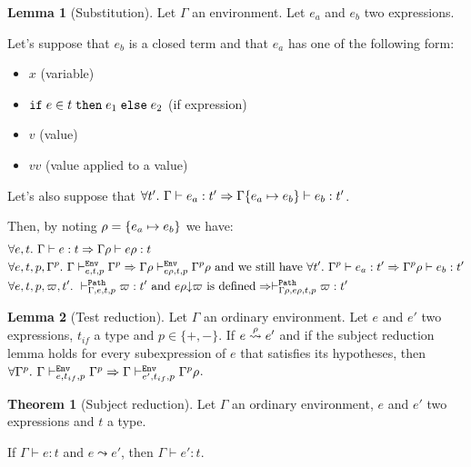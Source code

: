 \documentclass[a4paper]{article}
\theoremstyle{definition}
\newtheorem{theorem}{Theorem}
\newtheorem{lemma}{Lemma}
\begin{document}
        \begin{lemma}[Substitution]
          Let $\Gamma$ an environment. Let $e_a$ and $e_b$ two expressions.

          Let's suppose that $e_b$ is a closed term and that $e_a$ has one of the following form:
          \begin{itemize}
            \item $x$ (variable)
            \item $\ite e t {e_1} {e_2}$ (if expression)
            \item $v$ (value)
            \item $v v$ (value applied to a value)
          \end{itemize}
          Let's also suppose that $\forall t'.\ \Gamma \vdash e_a : t' \Rightarrow \Gamma\subst {e_a} {e_b} \vdash e_b:t'$.
          
          Then, by noting $\rho = \subst {e_a} {e_b}$ we have:
          \begin{align*}
            &\forall e,t.\ \Gamma \vdash e:t \Rightarrow \Gamma\rho \vdash e\rho:t\\
            &\forall e,t,p,\Gamma^p.\ \Gamma \evdash p {e} {t} \Gamma^p \Rightarrow \Gamma\rho \evdash p {e\rho} {t} {\Gamma^p}\rho
            \text{ and we still have } \forall t'.\ \Gamma^p \vdash e_a : t' \Rightarrow \Gamma^p\rho \vdash e_b:t'\\
            &\forall e,t,p,\varpi,t'.\ \pvdash \Gamma p e t \varpi:t' \text{ and }\occ {e\rho} \varpi\text{ is defined} \Rightarrow \pvdash {\Gamma\rho} p {e\rho} t \varpi:t'
          \end{align*}
        \end{lemma}

        \begin{lemma}[Test reduction]
          Let $\Gamma$ an ordinary environment. Let $e$ and $e'$ two expressions, $t_{if}$ a type and $p \in \{+,-\}$.
          If $e \xleadsto{\rho} e'$ and if the subject reduction lemma holds for every subexpression of $e$ that satisfies its hypotheses,
          then $\forall \Gamma^p.\ \Gamma \evdash p e {t_{if}} \Gamma^p \Rightarrow \Gamma \evdash p {e'} {t_{if}} \Gamma^p\rho$.
        \end{lemma}

        \begin{theorem}[Subject reduction]
          Let $\Gamma$ an ordinary environment, $e$ and $e'$ two expressions and $t$ a type.

          If $\Gamma\vdash e:t$ and $e\leadsto e'$, then $\Gamma\vdash e':t$.
        \end{theorem}
\end{document}
